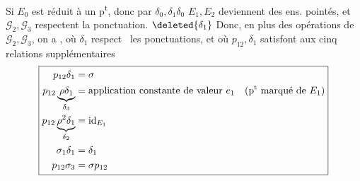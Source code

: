 Si $E_0$ est réduit à un p\textsuperscript{t}, donc par $\delta_0,\delta_1\delta_0$ $E_1,E_2$ deviennent des ens. pointés, et $\mathcal G_2,\mathcal G_3$ respectent la ponctuation.
$\deleted{\delta_1}$ 
Donc, en plus des opérations de $\mathcal G_2,\mathcal G_3$, on a
, où $\delta_1$  respect%
\ les ponctuations, et où $p_{12},\delta_1$ satisfont aux cinq relations supplémentaires
\[\boxed{\begin{aligned}
p_{12}\delta_1&=\sigma\\
p_{12}\underbrace{\rho\delta_1}_{\delta_3}&=\text{application constante de valeur }e_1\quad\text{(p\textsuperscript{t} marqué de }E_1\text{)}\\
p_{12}\underbrace{\rho^2\delta_1}_{\delta_2}&=\mathrm{id}_{E_1}\\
\sigma_1\delta_1&=\delta_1\\
p_{12}\sigma_3&=\sigma p_{12}
\end{aligned}}\]
